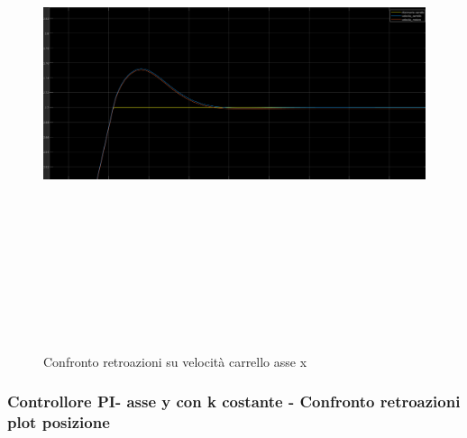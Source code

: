 \documentclass{article}
\begin{document}
\begin{figure}[H]
\centering
\includegraphics[width=13cm,height=15cm,keepaspectratio]{./simulink/ldm_rigido/PIDX_VELOCITAZOOM}
\caption{Confronto retroazioni su velocità carrello asse x}
\end{figure}
\subsubsection{Controllore PI- asse y con k costante - Confronto retroazioni plot posizione}
\end{document}

